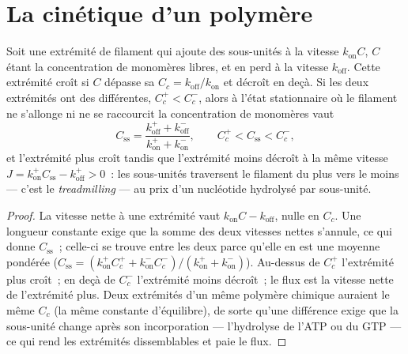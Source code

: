 \section{La cinétique d'un polymère}

\begin{theorem}\label{thm:b3:cytoskeleton-motility:treadmilling}
Soit une extrémité de filament qui ajoute des sous-unités à la vitesse
$k_{\text{on}}C$, $C$ étant la concentration de monomères libres, et en
perd à la vitesse $k_{\text{off}}$. Cette extrémité croît si $C$
dépasse sa \emph{}
$C_{c} = k_{\text{off}}/k_{\text{on}}$ et décroît en deçà. Si les deux
extrémités ont des  différentes, $C_{c}^{+}
< C_{c}^{-}$, alors à l'état stationnaire où le filament ne s'allonge
ni ne se raccourcit la concentration de monomères vaut
\[
C_{\text{ss}} = \frac{k_{\text{off}}^{+} + k_{\text{off}}^{-}}
{k_{\text{on}}^{+} + k_{\text{on}}^{-}},
\qquad C_{c}^{+} < C_{\text{ss}} < C_{c}^{-},
\]
et l'extrémité plus croît tandis que l'extrémité moins décroît à la
même vitesse
$J = k_{\text{on}}^{+}C_{\text{ss}} - k_{\text{off}}^{+} > 0$~: les
sous-unités traversent le filament du plus vers le moins --- c'est le
\emph{treadmilling} --- au prix d'un nucléotide hydrolysé par
sous-unité.
\end{theorem}
\begin{proof}
La vitesse nette à une extrémité vaut
$k_{\text{on}}C - k_{\text{off}}$, nulle en $C_{c}$. Une longueur
constante exige que la somme des deux vitesses nettes s'annule, ce qui
donne $C_{\text{ss}}$~; celle-ci se trouve entre les deux
 parce qu'elle en est une moyenne pondérée
($C_{\text{ss}} =
(k_{\text{on}}^{+}C_{c}^{+} + k_{\text{on}}^{-}C_{c}^{-})/(k_{\text{on}}^{+}
+ k_{\text{on}}^{-})$). Au-dessus de $C_{c}^{+}$ l'extrémité plus
croît~; en deçà de $C_{c}^{-}$ l'extrémité moins décroît~; le flux est
la vitesse nette de l'extrémité plus. Deux extrémités d'un même
polymère chimique auraient le même $C_{c}$ (la même constante
d'équilibre), de sorte qu'une différence exige que la sous-unité change
après son incorporation --- l'hydrolyse de l'ATP ou du GTP --- ce qui
rend les extrémités dissemblables et paie le flux.
\end{proof}

